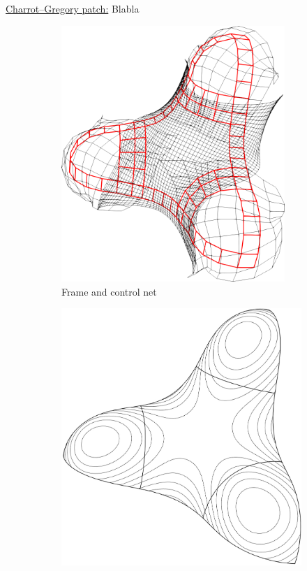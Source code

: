 \documentclass{article}
\begin{document}
\vspace{10pt}
\noindent\underline{Charrot--Gregory patch:}\vspace{0.2em}\newline
Blabla
\begin{figure}[h!]
  \label{fig:trebol}
  \begin{subfigure}{0.23\textwidth}
    \label{fig:trebol-cnet}
    \centering
    \includegraphics[width = 0.93\textwidth]{images/trebol3-cnet.png}
    \caption{Frame and control net}
  \end{subfigure}
  \begin{subfigure}{0.23\textwidth}
    \label{fig:trebol-contour}
    \includegraphics[width = \textwidth]{images/trebol3-contour.jpg}

\end{subfigure}
\end{figure}
\end{document}
